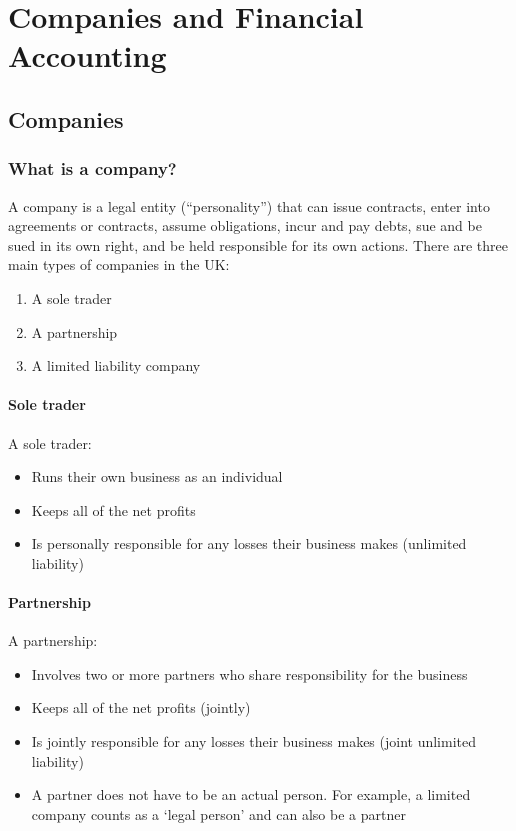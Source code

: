 \chapter{Companies and Financial Accounting}
\section{Companies}
\subsection{What is a company?}
A company is a legal entity (``personality'') that can issue contracts, enter into agreements or contracts, assume obligations, incur and pay debts, sue and be sued in its own right, and be held responsible for its own actions. There are three main types of companies in the UK:
\begin{enumerate}
    \item A sole trader
    \item A partnership
    \item A limited liability company
\end{enumerate}
\subsubsection{Sole trader}
A sole trader:
\begin{itemize}
    \item Runs their own business as an individual
    \item Keeps all of the net profits
    \item Is personally responsible for any losses their business makes (unlimited liability)
\end{itemize}
\subsubsection{Partnership}
A partnership:
\begin{itemize}
    \item Involves two or more partners who share responsibility for the business
    \item Keeps all of the net profits (jointly)
    \item Is jointly responsible for any losses their business makes (joint unlimited liability)
    \item A partner does not have to be an actual person. For example, a limited company counts as a `legal person' and can also be a partner
\end{itemize}
